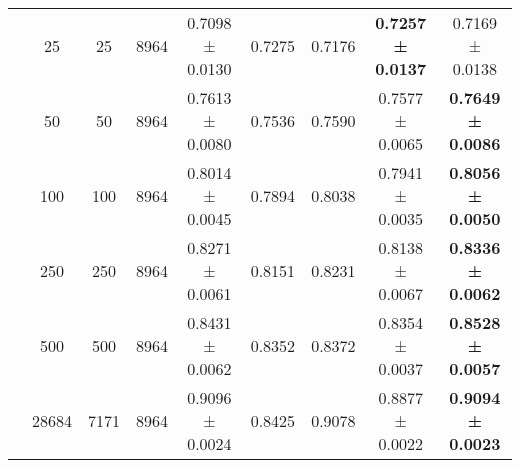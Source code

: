 \begin{table}
{\begin{tabular}[H]{@{}lcccccccc@{}}
                              & 25    & 25   & 8964 & 0.7098 ± 0.0130      & 0.7275               & 0.7176          & \textbf{0.7257 ± 0.0137} & 0.7169 ± 0.0138          \\
                              & 50    & 50   & 8964 & 0.7613 ± 0.0080      & 0.7536               & 0.7590          & 0.7577 ± 0.0065          & \textbf{0.7649 ± 0.0086} \\
                              & 100   & 100  & 8964 & 0.8014 ± 0.0045      & 0.7894               & 0.8038          & 0.7941 ± 0.0035          & \textbf{0.8056 ± 0.0050} \\
                              & 250   & 250  & 8964 & 0.8271 ± 0.0061      & 0.8151               & 0.8231          & 0.8138 ± 0.0067          & \textbf{0.8336 ± 0.0062} \\
                              & 500   & 500  & 8964 & 0.8431 ± 0.0062      & 0.8352               & 0.8372          & 0.8354 ± 0.0037          & \textbf{0.8528 ± 0.0057} \\
                              & 28684 & 7171 & 8964 & 0.9096 ± 0.0024      & 0.8425               & 0.9078          & 0.8877 ± 0.0022          & \textbf{0.9094 ± 0.0023} \\
\bottomrule
\end{tabular}}
\end{table}



